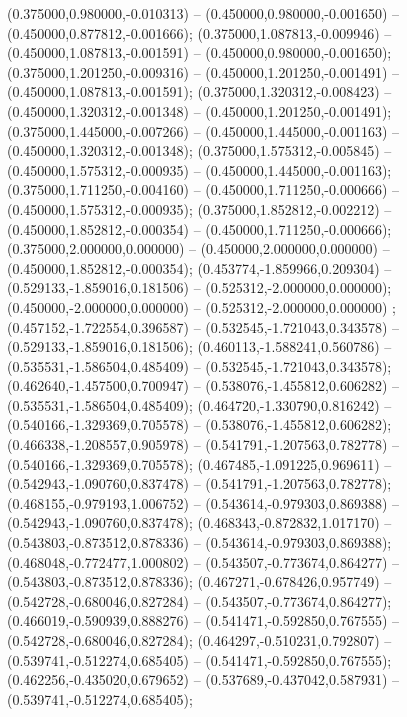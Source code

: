  (0.375000,0.980000,-0.010313) -- (0.450000,0.980000,-0.001650) -- (0.450000,0.877812,-0.001666);
 (0.375000,1.087813,-0.009946) -- (0.450000,1.087813,-0.001591) -- (0.450000,0.980000,-0.001650);
 (0.375000,1.201250,-0.009316) -- (0.450000,1.201250,-0.001491) -- (0.450000,1.087813,-0.001591);
 (0.375000,1.320312,-0.008423) -- (0.450000,1.320312,-0.001348) -- (0.450000,1.201250,-0.001491);
 (0.375000,1.445000,-0.007266) -- (0.450000,1.445000,-0.001163) -- (0.450000,1.320312,-0.001348);
 (0.375000,1.575312,-0.005845) -- (0.450000,1.575312,-0.000935) -- (0.450000,1.445000,-0.001163);
 (0.375000,1.711250,-0.004160) -- (0.450000,1.711250,-0.000666) -- (0.450000,1.575312,-0.000935);
 (0.375000,1.852812,-0.002212) -- (0.450000,1.852812,-0.000354) -- (0.450000,1.711250,-0.000666);
 (0.375000,2.000000,0.000000) -- (0.450000,2.000000,0.000000) -- (0.450000,1.852812,-0.000354);
 (0.453774,-1.859966,0.209304) -- (0.529133,-1.859016,0.181506) -- (0.525312,-2.000000,0.000000);
 (0.450000,-2.000000,0.000000) -- (0.525312,-2.000000,0.000000) ;
 (0.457152,-1.722554,0.396587) -- (0.532545,-1.721043,0.343578) -- (0.529133,-1.859016,0.181506);
 (0.460113,-1.588241,0.560786) -- (0.535531,-1.586504,0.485409) -- (0.532545,-1.721043,0.343578);
 (0.462640,-1.457500,0.700947) -- (0.538076,-1.455812,0.606282) -- (0.535531,-1.586504,0.485409);
 (0.464720,-1.330790,0.816242) -- (0.540166,-1.329369,0.705578) -- (0.538076,-1.455812,0.606282);
 (0.466338,-1.208557,0.905978) -- (0.541791,-1.207563,0.782778) -- (0.540166,-1.329369,0.705578);
 (0.467485,-1.091225,0.969611) -- (0.542943,-1.090760,0.837478) -- (0.541791,-1.207563,0.782778);
 (0.468155,-0.979193,1.006752) -- (0.543614,-0.979303,0.869388) -- (0.542943,-1.090760,0.837478);
 (0.468343,-0.872832,1.017170) -- (0.543803,-0.873512,0.878336) -- (0.543614,-0.979303,0.869388);
 (0.468048,-0.772477,1.000802) -- (0.543507,-0.773674,0.864277) -- (0.543803,-0.873512,0.878336);
 (0.467271,-0.678426,0.957749) -- (0.542728,-0.680046,0.827284) -- (0.543507,-0.773674,0.864277);
 (0.466019,-0.590939,0.888276) -- (0.541471,-0.592850,0.767555) -- (0.542728,-0.680046,0.827284);
 (0.464297,-0.510231,0.792807) -- (0.539741,-0.512274,0.685405) -- (0.541471,-0.592850,0.767555);
 (0.462256,-0.435020,0.679652) -- (0.537689,-0.437042,0.587931) -- (0.539741,-0.512274,0.685405);
